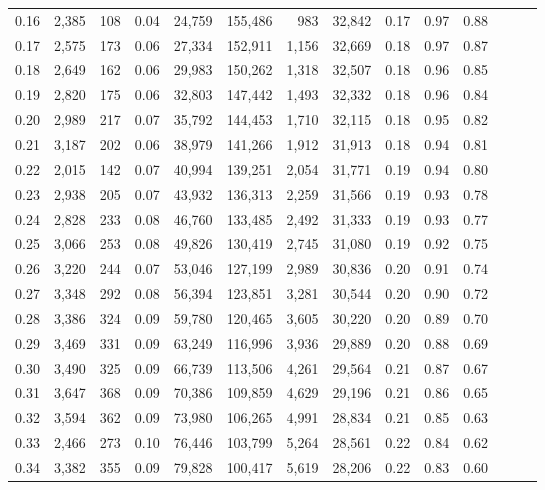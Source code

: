 \begin{tabular}{rrrrrrrrrrrrrr}
0.16 &  2,385 &  108 &  0.04 &   24,759 &  155,486 &     983 &  32,842 &  0.17 &  0.97 &      0.88 \\
0.17 &  2,575 &  173 &  0.06 &   27,334 &  152,911 &   1,156 &  32,669 &  0.18 &  0.97 &      0.87 \\
0.18 &  2,649 &  162 &  0.06 &   29,983 &  150,262 &   1,318 &  32,507 &  0.18 &  0.96 &      0.85 \\
0.19 &  2,820 &  175 &  0.06 &   32,803 &  147,442 &   1,493 &  32,332 &  0.18 &  0.96 &      0.84 \\
0.20 &  2,989 &  217 &  0.07 &   35,792 &  144,453 &   1,710 &  32,115 &  0.18 &  0.95 &      0.82 \\
0.21 &  3,187 &  202 &  0.06 &   38,979 &  141,266 &   1,912 &  31,913 &  0.18 &  0.94 &      0.81 \\
0.22 &  2,015 &  142 &  0.07 &   40,994 &  139,251 &   2,054 &  31,771 &  0.19 &  0.94 &      0.80 \\
0.23 &  2,938 &  205 &  0.07 &   43,932 &  136,313 &   2,259 &  31,566 &  0.19 &  0.93 &      0.78 \\
0.24 &  2,828 &  233 &  0.08 &   46,760 &  133,485 &   2,492 &  31,333 &  0.19 &  0.93 &      0.77 \\
0.25 &  3,066 &  253 &  0.08 &   49,826 &  130,419 &   2,745 &  31,080 &  0.19 &  0.92 &      0.75 \\
0.26 &  3,220 &  244 &  0.07 &   53,046 &  127,199 &   2,989 &  30,836 &  0.20 &  0.91 &      0.74 \\
0.27 &  3,348 &  292 &  0.08 &   56,394 &  123,851 &   3,281 &  30,544 &  0.20 &  0.90 &      0.72 \\
0.28 &  3,386 &  324 &  0.09 &   59,780 &  120,465 &   3,605 &  30,220 &  0.20 &  0.89 &      0.70 \\
0.29 &  3,469 &  331 &  0.09 &   63,249 &  116,996 &   3,936 &  29,889 &  0.20 &  0.88 &      0.69 \\
0.30 &  3,490 &  325 &  0.09 &   66,739 &  113,506 &   4,261 &  29,564 &  0.21 &  0.87 &      0.67 \\
0.31 &  3,647 &  368 &  0.09 &   70,386 &  109,859 &   4,629 &  29,196 &  0.21 &  0.86 &      0.65 \\
0.32 &  3,594 &  362 &  0.09 &   73,980 &  106,265 &   4,991 &  28,834 &  0.21 &  0.85 &      0.63 \\
0.33 &  2,466 &  273 &  0.10 &   76,446 &  103,799 &   5,264 &  28,561 &  0.22 &  0.84 &      0.62 \\
0.34 &  3,382 &  355 &  0.09 &   79,828 &  100,417 &   5,619 &  28,206 &  0.22 &  0.83 &      0.60 \\

\end{tabular}
